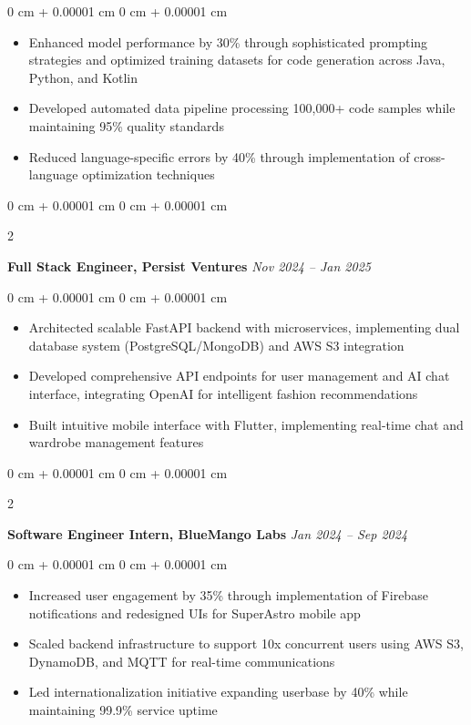 \documentclass[10pt, a4paper]{article}
\newcommand{\semibold}[1]{{\fontseries{sb}\selectfont #1}}
\newenvironment{highlights}{
    \begin{itemize}[
        topsep=0.10 cm,
        parsep=0.10 cm,
        partopsep=0pt,
        itemsep=0pt,
        leftmargin=0 cm + 10pt
    ]
}{
    \end{itemize}
}
\newenvironment{onecolentry}{
    \begin{adjustwidth}{
        0 cm + 0.00001 cm
    }{
        0 cm + 0.00001 cm
    }
}{
    \end{adjustwidth}
}
\newenvironment{twocolentry}[2][]{
    \onecolentry
    \def\secondColumn{#2}
    \setcolumnwidth{\fill, 4.5 cm}
    \begin{paracol}{2}
}{
    \switchcolumn \raggedleft \secondColumn
    \end{paracol}
    \endonecolentry
}
\begin{document}
\vspace{0.10 cm}
\begin{onecolentry}
    \begin{highlights}
        \item \semibold{Enhanced model performance by 30\%} through sophisticated prompting strategies and optimized training datasets for code generation across Java, Python, and Kotlin
        \item \semibold{Developed automated data pipeline} processing 100,000+ code samples while maintaining 95\% quality standards
        \item \semibold{Reduced language-specific errors by 40\%} through implementation of cross-language optimization techniques
    \end{highlights}
\end{onecolentry}

\begin{twocolentry}{
    \textit{Nov 2024 – Jan 2025}
}
    \textbf{Full Stack Engineer, Persist Ventures}\end{twocolentry}

\vspace{0.10 cm}
\begin{onecolentry}
    \begin{highlights}
        \item \semibold{Architected} scalable FastAPI backend with microservices, implementing dual database system (PostgreSQL/MongoDB) and AWS S3 integration
        \item \semibold{Developed} comprehensive API endpoints for user management and AI chat interface, integrating OpenAI for intelligent fashion recommendations
        \item \semibold{Built} intuitive mobile interface with Flutter, implementing real-time chat and wardrobe management features
    \end{highlights}
\end{onecolentry}

\begin{twocolentry}{
    \textit{Jan 2024 – Sep 2024}
}
    \textbf{Software Engineer Intern, BlueMango Labs}\end{twocolentry}

\vspace{0.10 cm}
\begin{onecolentry}
    \begin{highlights}
        \item \semibold{Increased user engagement by 35\%} through implementation of Firebase notifications and redesigned UIs for SuperAstro mobile app
        \item \semibold{Scaled backend infrastructure} to support 10x concurrent users using AWS S3, DynamoDB, and MQTT for real-time communications
        \item \semibold{Led internationalization initiative} expanding userbase by 40\% while maintaining 99.9\% service uptime
    \end{highlights}
\end{onecolentry}
\end{document}

